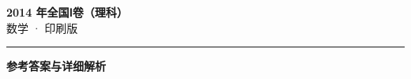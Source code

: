 \documentclass[zihao=5, a4paper]{ctexart}
\begin{document}
\begin{center}
  {\Large\bfseries 2014 年全国Ⅰ卷（理科）}\\[4pt]
  {\large 数学 · 印刷版}
\end{center}
\medskip
{}

\par\bigskip\hrule\bigskip
{}
\begin{center}{\large\bfseries 参考答案与详细解析}\end{center}
\smallskip

\end{document}
